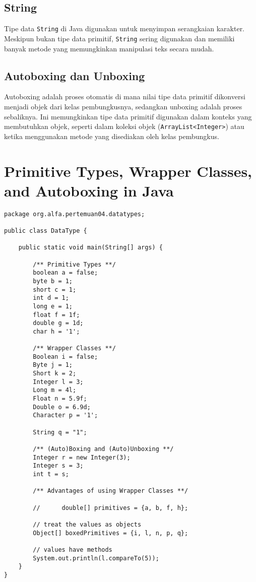 \subsection{String}
Tipe data \texttt{String} di Java digunakan untuk menyimpan serangkaian karakter. Meskipun bukan tipe data primitif, \texttt{String} sering digunakan dan memiliki banyak metode yang memungkinkan manipulasi teks secara mudah.

\subsection{Autoboxing dan Unboxing}
Autoboxing adalah proses otomatis di mana nilai tipe data primitif dikonversi menjadi objek dari kelas pembungkusnya, sedangkan unboxing adalah proses sebaliknya. Ini memungkinkan tipe data primitif digunakan dalam konteks yang membutuhkan objek, seperti dalam koleksi objek (\texttt{ArrayList<Integer>}) atau ketika menggunakan metode yang disediakan oleh kelas pembungkus.

\section{Primitive Types, Wrapper Classes, and Autoboxing in Java}

\begin{lstlisting}[style=JavaStyle, caption={Primitive Types, Wrapper Classes, and Autoboxing in Java}]
package org.alfa.pertemuan04.datatypes;

public class DataType {
	
	public static void main(String[] args) {
		
		/** Primitive Types **/
		boolean a = false;
		byte b = 1;
		short c = 1;
		int d = 1;
		long e = 1;
		float f = 1f;
		double g = 1d;
		char h = '1';
		
		/** Wrapper Classes **/
		Boolean i = false;
		Byte j = 1;
		Short k = 2;
		Integer l = 3;
		Long m = 4l;
		Float n = 5.9f;
		Double o = 6.9d;
		Character p = '1';
		
		String q = "1";
		
		/** (Auto)Boxing and (Auto)Unboxing **/
		Integer r = new Integer(3); 
		Integer s = 3;
		int t = s;
		
		/** Advantages of using Wrapper Classes **/
		
		//      double[] primitives = {a, b, f, h};
		
		// treat the values as objects
		Object[] boxedPrimitives = {i, l, n, p, q};
		
		// values have methods
		System.out.println(l.compareTo(5));
	}
}
\end{lstlisting}

